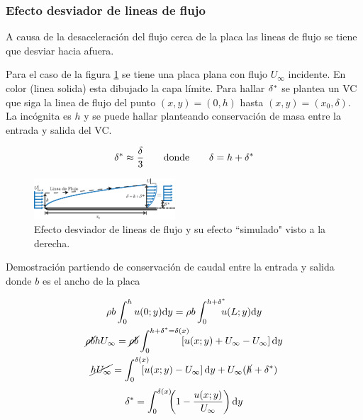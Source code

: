 \subsubsection*{Efecto desviador de lineas de flujo}
A causa de la desaceleración del flujo cerca de la placa las lineas de flujo se tiene que desviar hacia afuera. 

Para el caso de la figura \ref{fig:displthickness} se tiene una placa plana con flujo $U_\infty$ incidente. En color (linea solida) esta dibujado la capa límite. Para hallar $\delta^{*}$ se plantea un VC que siga la linea de flujo del punto $(x,y)=(0,h)$ hasta $(x,y)=(x_0,\delta)$. La incógnita es $h$ y se puede hallar planteando conservación de masa entre la entrada y salida del VC.

\begin{equation}
    \delta^{*} \approx \frac{\delta}{3}  \qquad \textrm{donde}\qquad  \delta=h+\delta^{*}
\end{equation}


\begin{figure}[htb!]
    \centering
    \includegraphics[width=0.47\textwidth]{fig/BLdispthick.eps}
    \caption{Efecto desviador de lineas de flujo y su efecto ``simulado"{} visto a la derecha.}
    \label{fig:displthickness}
\end{figure}

Demostración partiendo de conservación de caudal entre la entrada y salida donde $b$ es el ancho de la placa

\begin{gather*}
	\rho b \int^h_0 u(0;y)\di y = \rho b \int^{h+\dstar}_0 \!\!\!\!u(L;y)\di y \\
	\cancel{\rho b} h U_\infty =\cancel{\rho b}\int^{h+\dstar=\delta(x)}_0 \!\!\!\!\!\!\left[u(x;y)+U_\infty-U_\infty \right]\di y\\	
	\cancel{hU_\infty} = \int^{\delta(x)}_0 \!\!\!\!\!\!\left[u(x;y)-U_\infty \right]\di y+U_\infty (\cancel{h}+\dstar)
\end{gather*}
\begin{equation}
	\delta^{*} = \int_0^{\delta(x)} \!\!\!\left(1-\frac{u(x;y)}{U_\infty} \right) \textrm{d} y
\end{equation}



